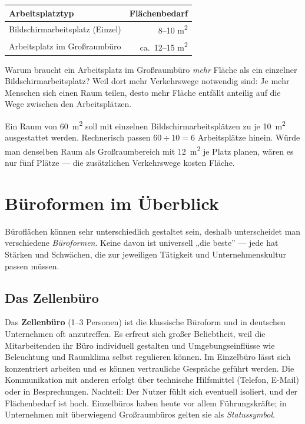 \documentclass[11pt, a4paper]{article}
\begin{document}
\begin{center}
\begin{tabular}{p{7cm} r}
\toprule
\textbf{Arbeitsplatztyp} & \textbf{Flächenbedarf}\\
\midrule
Bildschirmarbeitsplatz (Einzel) & 8--10 m\textsuperscript{2}\\
Arbeitsplatz im Großraumbüro & ca.\ 12--15 m\textsuperscript{2}\\
\bottomrule
\end{tabular}
\end{center}

\medskip
Warum braucht ein Arbeitsplatz im Großraumbüro \emph{mehr} Fläche als ein einzelner
Bildschirmarbeitsplatz? Weil dort mehr Verkehrswege notwendig sind: Je mehr Menschen
sich einen Raum teilen, desto mehr Fläche entfällt anteilig auf die Wege zwischen den
Arbeitsplätzen.

\begin{beispiel}
Ein Raum von 60~m\textsuperscript{2} soll mit einzelnen Bildschirmarbeitsplätzen zu je
10~m\textsuperscript{2} ausgestattet werden. Rechnerisch passen
$60 \div 10 = 6$ Arbeitsplätze hinein. Würde man denselben Raum als Großraum\-bereich
mit 12~m\textsuperscript{2} je Platz planen, wären es nur fünf Plätze --- die zusätzlichen
Verkehrswege kosten Fläche.
\end{beispiel}

\section{Büroformen im Überblick}

Büroflächen können sehr unterschiedlich gestaltet sein, deshalb unterscheidet man
verschiedene \emph{Büroformen}. Keine davon ist universell „die beste” --- jede hat
Stärken und Schwächen, die zur jeweiligen Tätigkeit und Unternehmenskultur passen
müssen.

\subsection{Das Zellenbüro}

Das \textbf{Zellenbüro} (1--3 Personen) ist die klassische Büroform und in deutschen
Unternehmen oft anzutreffen. Es erfreut sich großer Beliebtheit, weil die Mitarbeitenden
ihr Büro individuell gestalten und Umgebungseinflüsse wie Beleuchtung und Raumklima
selbst regulieren können. Im Einzelbüro lässt sich konzentriert arbeiten und es können
vertrauliche Gespräche geführt werden. Die Kommunikation mit anderen erfolgt über
technische Hilfsmittel (Telefon, E-Mail) oder in Besprechungen. Nachteil: Der Nutzer
fühlt sich eventuell isoliert, und der Flächenbedarf ist hoch. Einzelbüros haben heute
vor allem Führungskräfte; in Unternehmen mit überwiegend Großraumbüros gelten sie als
\emph{Statussymbol}.
\end{document}
